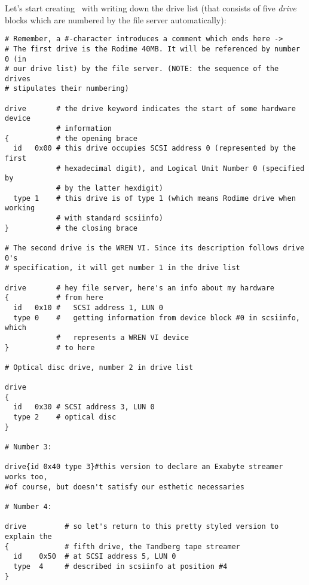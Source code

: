 
Let's start creating \DI\ with writing down the drive list (that consists of
five {\it drive} blocks which are numbered by the file server automatically):


\begin{listing}
  \begin{verbatim}
# Remember, a #-character introduces a comment which ends here ->
# The first drive is the Rodime 40MB. It will be referenced by number 0 (in
# our drive list) by the file server. (NOTE: the sequence of the drives
# stipulates their numbering)

drive       # the drive keyword indicates the start of some hardware device 
            # information
{           # the opening brace
  id   0x00 # this drive occupies SCSI address 0 (represented by the first
            # hexadecimal digit), and Logical Unit Number 0 (specified by
            # by the latter hexdigit)
  type 1    # this drive is of type 1 (which means Rodime drive when working
            # with standard scsiinfo)
}           # the closing brace

# The second drive is the WREN VI. Since its description follows drive 0's
# specification, it will get number 1 in the drive list

drive       # hey file server, here's an info about my hardware
{           # from here
  id   0x10 #   SCSI address 1, LUN 0
  type 0    #   getting information from device block #0 in scsiinfo, which
            #   represents a WREN VI device
}           # to here

# Optical disc drive, number 2 in drive list

drive
{
  id   0x30 # SCSI address 3, LUN 0
  type 2    # optical disc
}

# Number 3:

drive{id 0x40 type 3}#this version to declare an Exabyte streamer works too,
#of course, but doesn't satisfy our esthetic necessaries

# Number 4:

drive         # so let's return to this pretty styled version to explain the
{             # fifth drive, the Tandberg tape streamer
  id    0x50  # at SCSI address 5, LUN 0
  type  4     # described in scsiinfo at position #4
}
  \end{verbatim}
\end{listing}

